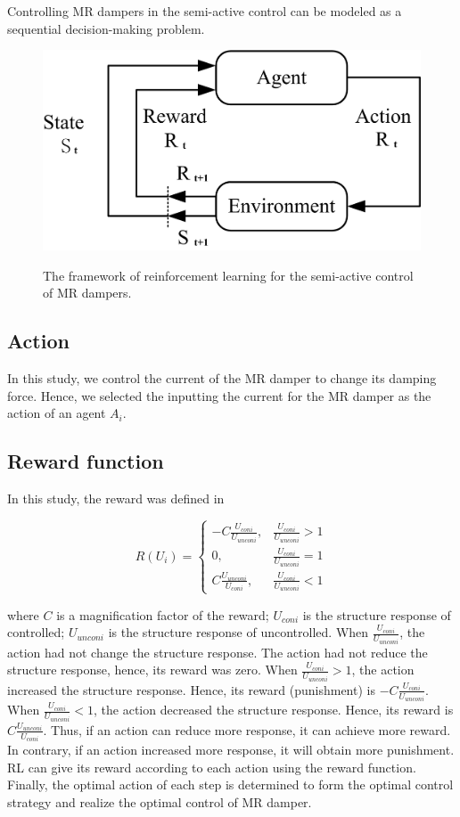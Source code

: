 Controlling MR dampers in the semi-active control can be modeled as a sequential decision-making problem. 
\begin{figure}[!h]
\centering
{\includegraphics[width=1.0\textwidth]{interaction.jpg}} 
\caption{The framework of reinforcement learning for the semi-active control of MR dampers.} 
\label{interaction} 
\end{figure} 
\subsection{Action}

In this study, we control the current of the MR damper to change its damping force. Hence, we selected the inputting the current for the MR damper as the action of an agent $A_i$. 

\subsection{Reward function}

In this study, the reward was defined in

\begin{equation}
R(U_i)=
\begin{cases}
-C \frac{U_{coni}}{U_{unconi}},  & \frac{U_{coni}}{U_{unconi}} > 1 \\
0, & \frac{U_{coni}}{U_{unconi}} = 1 \\
C \frac{U_{unconi}}{U_{coni}}, & \frac{U_{coni}}{U_{unconi}} < 1 
\end{cases}
\end{equation}

where $C$ is a magnification factor of the reward; $U_{coni}$ is the structure response of controlled; $U_{unconi}$ is the structure response of uncontrolled. When $ \frac{U_{coni}}{U_{unconi}} $, the action had not change the structure response. The action had not reduce the structure response, hence, its reward was zero. When $\frac{U_{coni}}{U_{unconi}} > 1$, the action increased the structure response. Hence, its reward (punishment) is $-C \frac{U_{coni}}{U_{unconi}}$. When $\frac{U_{coni}}{U_{unconi}} < 1$, the action decreased the structure response. Hence, its reward is $C \frac{U_{unconi}}{U_{coni}}$. Thus, if an action can reduce more response, it can achieve more reward. In contrary, if an action increased more response, it will obtain more punishment. RL can give its reward according to each action using the reward function. Finally, the optimal action of each step is determined to form the optimal control strategy and realize the optimal control of MR damper.

